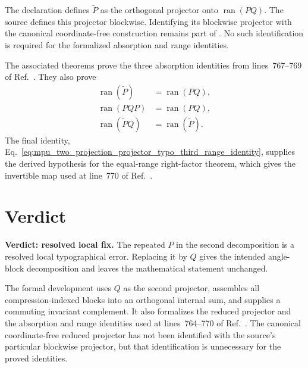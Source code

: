 \documentclass{article}
\begin{document}
The declaration
 defines
$\widetilde P$ as the orthogonal projector onto $\operatorname{ran}(PQ)$. The
source defines this projector blockwise. Identifying its blockwise projector
with the canonical coordinate-free construction remains part of
. No such identification is required for the formalized
absorption and range identities.

The associated theorems prove the three absorption identities from
lines~767--769 of Ref.~\cite{Cirac2017MPU}. They also prove
\begin{align}
    \operatorname{ran}(\widetilde P)
        &= \operatorname{ran}(PQ),
    \label{eq:mpu_two_projection_projector_typo_first_range_identity}\\
    \operatorname{ran}(PQP)
        &= \operatorname{ran}(PQ),
    \label{eq:mpu_two_projection_projector_typo_second_range_identity}\\
    \operatorname{ran}(\widetilde P Q)
        &= \operatorname{ran}(\widetilde P).
    \label{eq:mpu_two_projection_projector_typo_third_range_identity}
\end{align}
The final identity,
Eq.~\ref{eq:mpu_two_projection_projector_typo_third_range_identity}, supplies
the derived hypothesis for the equal-range right-factor theorem, which gives
the invertible map used at line~770 of Ref.~\cite{Cirac2017MPU}.

\section{Verdict}

\textbf{Verdict: resolved local fix.}
The repeated $P$ in the second decomposition is a resolved local
typographical error. Replacing it by $Q$ gives the intended angle-block
decomposition and leaves the mathematical statement unchanged.

The formal development uses $Q$ as the second projector, assembles all
compression-indexed blocks into an orthogonal internal sum, and supplies a
commuting invariant complement. It also formalizes the reduced projector and
the absorption and range identities used at lines~764--770 of
Ref.~\cite{Cirac2017MPU}. The canonical coordinate-free reduced projector has
not been identified with the source's particular blockwise projector, but that
identification is unnecessary for the proved identities.



\end{document}
